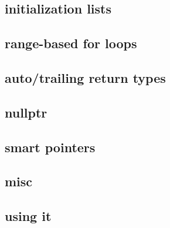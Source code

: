

\subsection{initialization lists}



\subsection{range-based for loops}



\subsection{auto/trailing return types}





\subsection{nullptr}



\subsection{smart pointers}



\subsection{misc}



\subsection{using it}


